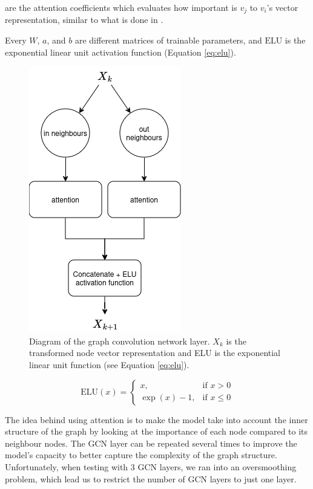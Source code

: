 are the attention coefficients
which evaluates how important is $v_j$ to $v_i$'s vector 
representation, similar to what is done in \citet{Lee2021GlobalDagSchedDRL}.

Every $W$, $a$, and $b$ are different matrices of trainable parameters,
and $\text{ELU}$ is the exponential linear unit activation function (Equation \ref{eq:elu}).

\begin{figure}
    \centering
    \includegraphics[width=0.5\linewidth]{images/gcn_update_aggregate_diagram.png}
    \caption{Diagram of the graph convolution network layer. $X_k$ is the transformed node vector representation
    and ELU is the exponential linear unit function (see Equation \ref{eq:elu}).}
    \label{fig:update_aggregate_diagram}
\end{figure}

\begin{equation}
\text{ELU}(x) = 
\begin{cases}
x, & \text{if } x > 0 \\
\exp(x) - 1, & \text{if } x \leq 0
\end{cases}
\label{eq:elu}
\end{equation}


The idea behind using attention is to make the model 
take into account the inner structure of the graph by 
looking at the importance of each node
compared to its neighbour nodes.
The GCN layer can be repeated several times 
to improve the model's capacity to better
capture the complexity of the graph structure.
Unfortunately, when testing with 3 GCN layers,
we ran into an oversmoothing problem\cite{chen2020oversmoothing}, which lead us 
to restrict the number of GCN layers to just one layer.

